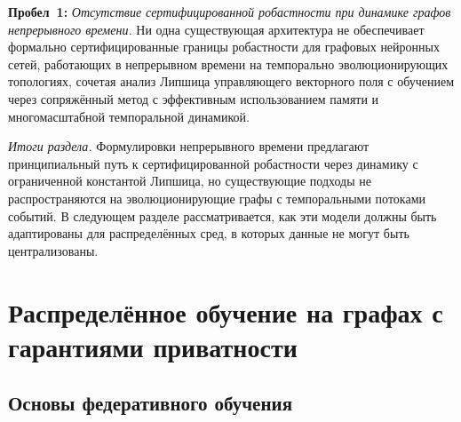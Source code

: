 \medskip
\noindent\textbf{Пробел~1:} \emph{Отсутствие сертифицированной робастности при динамике графов непрерывного времени.} Ни одна существующая архитектура не обеспечивает формально сертифицированные границы робастности для графовых нейронных сетей, работающих в непрерывном времени на темпорально эволюционирующих топологиях, сочетая анализ Липшица управляющего векторного поля с обучением через сопряжённый метод с эффективным использованием памяти и многомасштабной темпоральной динамикой.

\medskip
\noindent\textit{Итоги раздела.} Формулировки непрерывного времени предлагают принципиальный путь к сертифицированной робастности через динамику с ограниченной константой Липшица, но существующие подходы не распространяются на эволюционирующие графы с темпоральными потоками событий. В следующем разделе рассматривается, как эти модели должны быть адаптированы для распределённых сред, в которых данные не могут быть централизованы.


\section{Распределённое обучение на графах с гарантиями приватности}
\label{sec:distributed}

\subsection{Основы федеративного обучения}

